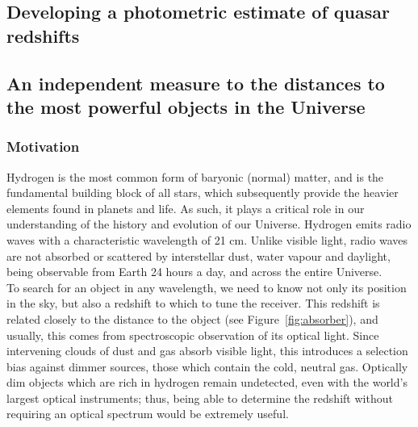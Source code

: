 \documentclass[11pt,a4paper]{report}
\author{Jeremy Moss}
\begin{document}
	
	\begin{center}
	\section*{Developing a photometric estimate of quasar redshifts}
	\subsection*{An independent measure to the distances to\\the most powerful objects in the Universe}
	\end{center}
	

	\subsubsection*{Motivation}
	Hydrogen is the most common form of baryonic (normal) matter, and is the
	fundamental building block of all stars, which subsequently provide the heavier elements
	found in planets and life. As such, it plays a critical role in our
	understanding of the history and evolution of our Universe. Hydrogen emits radio
	waves with a characteristic wavelength of 21 cm. Unlike visible light, radio
	waves are not absorbed or scattered by interstellar dust, water vapour and
	daylight, being observable from Earth 24 hours a day, and across the entire
	Universe.\\
	
	To search for an object in any wavelength, we need to know not only its	position in the sky, but also a redshift to which to tune the receiver. This
	redshift is related closely to the distance to the object (see
	Figure~\ref{fig:absorber}), and usually, this comes from spectroscopic observation of
	its optical light. Since intervening clouds of dust and gas absorb visible light, this introduces a selection bias against dimmer sources, those which contain the cold, neutral gas. Optically dim objects which are
	rich in hydrogen remain undetected, even with the world's largest optical
	instruments; thus, being able to determine the redshift without requiring an optical spectrum would be extremely useful.\\\\
	
\end{document}
